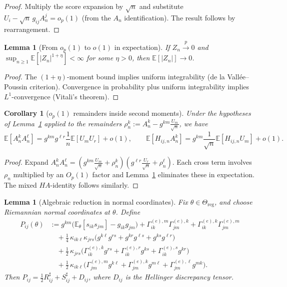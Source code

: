 \documentclass[11pt,letterpaper]{amsart}
\newcommand{\E}{\mathbb{E}}
\numberwithin{equation}{section}
\theoremstyle{plain}
\newtheorem{lemma}[theorem]{Lemma}
\newtheorem{corollary}[theorem]{Corollary}
\theoremstyle{definition}
\theoremstyle{remark}
\begin{document}
\begin{proof}
Multiply the score expansion by $\sqrt n$ and substitute $U_i - \sqrt n\,g_{ij}A_n^j = o_p(1)$ (from the $A_n$ identification). The result follows by rearrangement.
\end{proof}


\begin{lemma}[From \(o_p(1)\) to \(o(1)\) in expectation]
\label{lem:op_to_o_expectation}
If $Z_n \xrightarrow{p} 0$ and $\sup_{n\ge1}\E[|Z_n|^{1+\eta}] < \infty$ for some $\eta > 0$, then $\E[|Z_n|] \to 0$.
\end{lemma}

\begin{proof}
The $(1+\eta)$-moment bound implies uniform integrability (de la Vall\'ee--Poussin criterion). Convergence in probability plus uniform integrability implies $L^1$-convergence (Vitali's theorem).
\end{proof}


\begin{corollary}[\(o_p(1)\) remainders inside second moments]
\label{cor:remainder_second_moments}
Under the hypotheses of Lemma~\ref{lem:op_to_o_expectation} applied to the remainders $\rho_n^k := A_n^k - g^{km}\frac{U_m}{\sqrt n}$, we have
\[
\E[A_n^kA_n^\ell] = g^{km}g^{\ell r}\frac1n\E[U_mU_r] + o(1),
\qquad
\E[H_{ij,n}A_n^k] = g^{km}\frac1{\sqrt n}\E[H_{ij,n}U_m] + o(1).
\]
\end{corollary}

\begin{proof}
Expand $A_n^kA_n^\ell = (g^{km}\frac{U_m}{\sqrt n}+\rho_n^k)(g^{\ell r}\frac{U_r}{\sqrt n}+\rho_n^\ell)$. Each cross term involves $\rho_n$ multiplied by an $O_p(1)$ factor and Lemma~\ref{lem:op_to_o_expectation} eliminates these in expectation. The mixed $HA$-identity follows similarly.
\end{proof}


\begin{lemma}[Algebraic reduction in normal coordinates]
\label{lem:algebraic_reduction}
Fix \(\theta\in\Theta_{\mathrm{reg}}\), and choose Riemannian normal coordinates at \(\theta\). Define
\begin{align*}
P_{ij}(\theta)
&:=
g^{km}\Big(\E_\theta[s_{ik}s_{jm}]-g_{ik}g_{jm}\Big)
+\Gamma^{(e),m}_{ik}\Gamma^{(e),k}_{jm}
+\Gamma^{(e),k}_{ik}\Gamma^{(e),m}_{jm}
\\
&\quad
+\frac14\,\kappa_{ik\ell}\kappa_{jrs}
\Big(g^{k\ell}g^{rs}+g^{kr}g^{\ell s}+g^{ks}g^{\ell r}\Big)
\\
&\quad
+\frac12\,\kappa_{jrs}\Big(\Gamma^{(e),k}_{ik}g^{rs}+\Gamma^{(e),r}_{ik}g^{ks}+\Gamma^{(e),s}_{ik}g^{kr}\Big)
\\
&\quad
+\frac12\,\kappa_{ik\ell}\Big(\Gamma^{(e),m}_{jm}g^{k\ell}+\Gamma^{(e),k}_{jm}g^{m\ell}+\Gamma^{(e),\ell}_{jm}g^{mk}\Big).
\end{align*}
Then $P_{ij}=\frac12 R^\sharp_{ij}+S^\sharp_{ij}+D_{ij}$, where $D_{ij}$ is the Hellinger discrepancy tensor.
\end{lemma}
\end{document}

